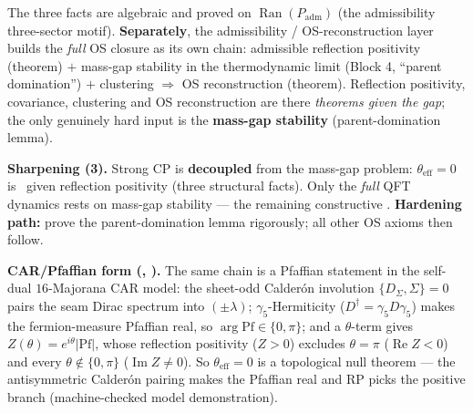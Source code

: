 \begin{center}
\end{center}

\noindent The three facts are algebraic and proved on $\operatorname{Ran}(P_{\mathrm{adm}})$ (the
admissibility three-sector motif). \textbf{Separately}, the admissibility / OS-reconstruction layer builds the \emph{full} OS
closure as its own chain: admissible reflection positivity (theorem) $+$ mass-gap stability in the
thermodynamic limit (Block 4, ``parent domination'') $+$ clustering $\Rightarrow$ OS reconstruction
(theorem). Reflection positivity, covariance, clustering and OS reconstruction are there \emph{theorems
given the gap}; the only genuinely hard input is the \textbf{mass-gap stability} (parent-domination
lemma).

\par\smallskip\noindent\textbf{Sharpening (3).}
Strong CP is \textbf{decoupled} from the mass-gap problem: $\theta_{\mathrm{eff}}=0$ is \mE\ given
reflection positivity (three structural facts). Only the \emph{full} QFT dynamics rests on mass-gap
stability --- the remaining constructive \mC. \textbf{Hardening path:} prove the parent-domination
lemma rigorously; all other OS axioms then follow.

\par\smallskip\noindent\textbf{CAR/Pfaffian form (, \mE).} The same chain
is a Pfaffian statement in the self-dual $16$-Majorana CAR model: the sheet-odd Calder\'on involution
$\{D_\Sigma,\Sigma\}=0$ pairs the seam Dirac spectrum into $(\pm\lambda)$; $\gamma_5$-Hermiticity
($D^\dagger=\gamma_5 D\gamma_5$) makes the fermion-measure Pfaffian real, so $\arg\mathrm{Pf}\in\{0,\pi\}$;
and a $\theta$-term gives $Z(\theta)=e^{i\theta}|\mathrm{Pf}|$, whose reflection positivity ($Z>0$)
excludes $\theta=\pi$ ($\operatorname{Re}Z<0$) and every $\theta\notin\{0,\pi\}$ ($\operatorname{Im}Z\neq0$).
So $\theta_{\mathrm{eff}}=0$ is a topological null theorem --- the antisymmetric Calder\'on pairing makes
the Pfaffian real and RP picks the positive branch (machine-checked model demonstration).

